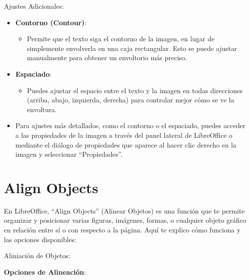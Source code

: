 \documentclass[
  jou,
  floatsintext,
  longtable,
  a4paper,
  nolmodern,
  notxfonts,
  notimes,
  colorlinks=true,linkcolor=blue,citecolor=blue,urlcolor=blue]{apa7}
\providecommand{\tightlist}{%
  \setlength{\itemsep}{0pt}\setlength{\parskip}{0pt}}
\begin{document}
Ajustes Adicionales:

\begin{itemize}
\item
  \textbf{Contorno (Contour)}:

  \begin{itemize}
  \tightlist
  \item
    Permite que el texto siga el contorno de la imagen, en lugar de
    simplemente envolverla en una caja rectangular. Esto se puede
    ajustar manualmente para obtener un envoltorio más preciso.
  \end{itemize}
\item
  \textbf{Espaciado}:

  \begin{itemize}
  \tightlist
  \item
    Puedes ajustar el espacio entre el texto y la imagen en todas
    direcciones (arriba, abajo, izquierda, derecha) para controlar mejor
    cómo se ve la envoltura.
  \end{itemize}
\item
  Para ajustes más detallados, como el contorno o el espaciado, puedes
  acceder a las propiedades de la imagen a través del panel lateral de
  LibreOffice o mediante el diálogo de propiedades que aparece al hacer
  clic derecho en la imagen y seleccionar ``Propiedades''.
\end{itemize}

\section{Align Objects}\label{align-objects}

En LibreOffice, ``Align Objects'' (Alinear Objetos) es una función que
te permite organizar y posicionar varias figuras, imágenes, formas, o
cualquier objeto gráfico en relación entre sí o con respecto a la
página. Aquí te explico cómo funciona y las opciones disponibles:

Aliniación de Objetos:

\textbf{Opciones de Alineación}:
\end{document}

